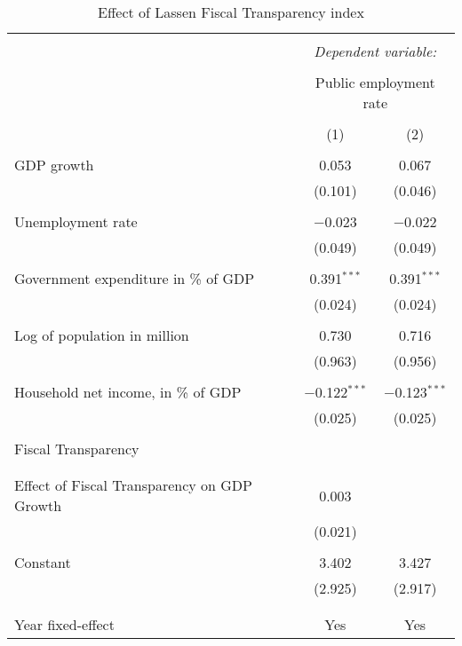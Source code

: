 
\begin{table}[!htbp] \centering 
  \caption{Effect of Lassen Fiscal Transparency index} 
  \label{} 
\begin{tabular}{@{\extracolsep{5pt}}lcc} 
\\[-1.8ex]\hline 
\hline \\[-1.8ex] 
 & \multicolumn{2}{c}{\textit{Dependent variable:}} \\ 
\cline{2-3} 
\\[-1.8ex] & \multicolumn{2}{c}{Public employment rate} \\ 
\\[-1.8ex] & (1) & (2)\\ 
\hline \\[-1.8ex] 
 GDP growth & 0.053 & 0.067 \\ 
  & (0.101) & (0.046) \\ 
  & & \\ 
 Unemployment rate & $-$0.023 & $-$0.022 \\ 
  & (0.049) & (0.049) \\ 
  & & \\ 
 Government expenditure in \% of GDP & 0.391$^{***}$ & 0.391$^{***}$ \\ 
  & (0.024) & (0.024) \\ 
  & & \\ 
 Log of population in million & 0.730 & 0.716 \\ 
  & (0.963) & (0.956) \\ 
  & & \\ 
 Household net income, in \% of GDP & $-$0.122$^{***}$ & $-$0.123$^{***}$ \\ 
  & (0.025) & (0.025) \\ 
  & & \\ 
 Fiscal Transparency &  &  \\ 
  &  &  \\ 
  & & \\ 
 Effect of Fiscal Transparency on GDP Growth & 0.003 &  \\ 
  & (0.021) &  \\ 
  & & \\ 
 Constant & 3.402 & 3.427 \\ 
  & (2.925) & (2.917) \\ 
  & & \\ 
\hline \\[-1.8ex] 
Year fixed-effect & Yes & Yes \\ 

\end{tabular}
\end{table}
